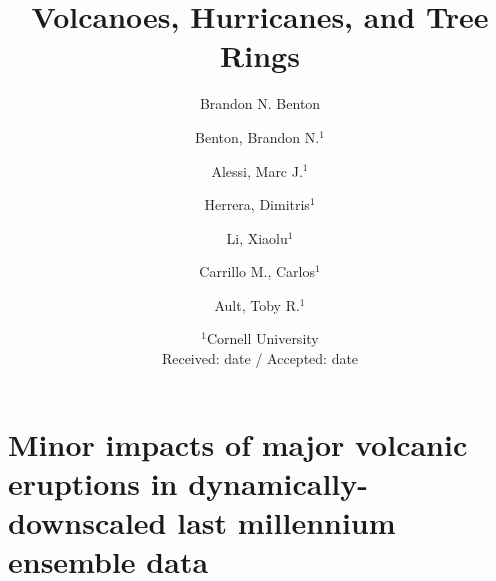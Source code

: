 \documentclass[phd,tocprelim]{cornell}
\title {Volcanoes, Hurricanes, and Tree Rings}
\author {Brandon N. Benton}
\begin{document}
\chapter{Minor impacts of major volcanic eruptions in
  dynamically-downscaled last millennium ensemble data} %

\author{Benton, Brandon N.$^1$ \and Alessi, Marc J.$^1$ \and Herrera, Dimitris$^1$ \and Li, Xiaolu$^1$ \and Carrillo M., Carlos$^1$ \and Ault, Toby R.$^1$}



\date{$^1$Cornell University \\
Received: date / Accepted: date}
\end{document}

